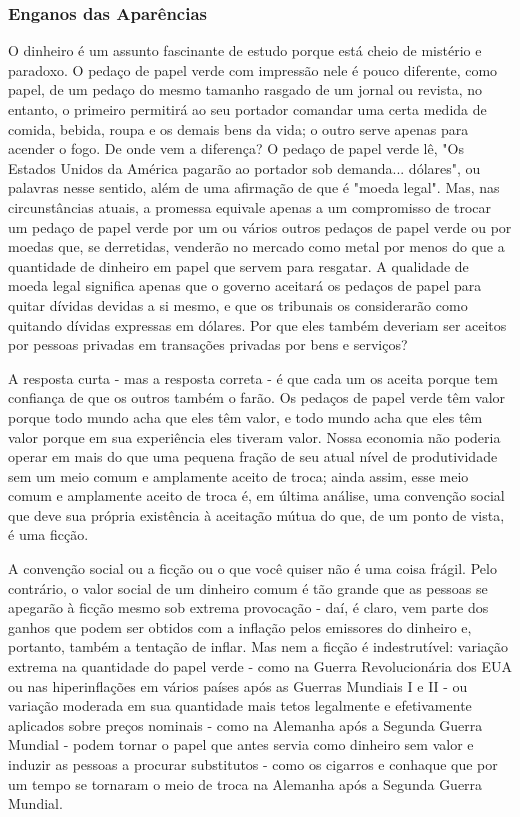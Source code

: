 \documentclass[12pt]{article}
\begin{document}
\subsubsection{\textbf{Enganos das Aparências}}
O dinheiro é um assunto fascinante de estudo porque está cheio de mistério e paradoxo. O pedaço de papel verde com impressão nele é pouco diferente, como papel, de um pedaço do mesmo tamanho rasgado de um jornal ou revista, no entanto, o primeiro permitirá ao seu portador comandar uma certa medida de comida, bebida, roupa e os demais bens da vida; o outro serve apenas para acender o fogo. De onde vem a diferença? O pedaço de papel verde lê, "Os Estados Unidos da América pagarão ao portador sob demanda... dólares", ou palavras nesse sentido, além de uma afirmação de que é "moeda legal". Mas, nas circunstâncias atuais, a promessa equivale apenas a um compromisso de trocar um pedaço de papel verde por um ou vários outros pedaços de papel verde ou por moedas que, se derretidas, venderão no mercado como metal por menos do que a quantidade de dinheiro em papel que servem para resgatar. A qualidade de moeda legal significa apenas que o governo aceitará os pedaços de papel para quitar dívidas devidas a si mesmo, e que os tribunais os considerarão como quitando dívidas expressas em dólares. Por que eles também deveriam ser aceitos por pessoas privadas em transações privadas por bens e serviços?

A resposta curta - mas a resposta correta - é que cada um os aceita porque tem confiança de que os outros também o farão. Os pedaços de papel verde têm valor porque todo mundo acha que eles têm valor, e todo mundo acha que eles têm valor porque em sua experiência eles tiveram valor. Nossa economia não poderia operar em mais do que uma pequena fração de seu atual nível de produtividade sem um meio comum e amplamente aceito de troca; ainda assim, esse meio comum e amplamente aceito de troca é, em última análise, uma convenção social que deve sua própria existência à aceitação mútua do que, de um ponto de vista, é uma ficção.

A convenção social ou a ficção ou o que você quiser não é uma coisa frágil. Pelo contrário, o valor social de um dinheiro comum é tão grande que as pessoas se apegarão à ficção mesmo sob extrema provocação - daí, é claro, vem parte dos ganhos que podem ser obtidos com a inflação pelos emissores do dinheiro e, portanto, também a tentação de inflar. Mas nem a ficção é indestrutível: variação extrema na quantidade do papel verde - como na Guerra Revolucionária dos EUA ou nas hiperinflações em vários países após as Guerras Mundiais I e II - ou variação moderada em sua quantidade mais tetos legalmente e efetivamente aplicados sobre preços nominais - como na Alemanha após a Segunda Guerra Mundial - podem tornar o papel que antes servia como dinheiro sem valor e induzir as pessoas a procurar substitutos - como os cigarros e conhaque que por um tempo se tornaram o meio de troca na Alemanha após a Segunda Guerra Mundial.
\end{document}
